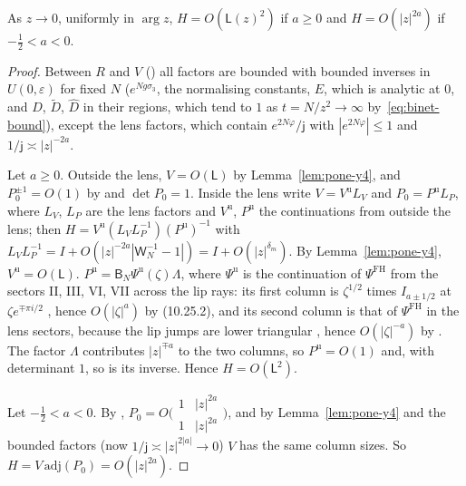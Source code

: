 \begin{lemma}[$H$ near $0$]\label{lem:pone-H0}
As $z\to0$, uniformly in $\arg z$, $H=O(\mathsf L(z)^2)$ if $a\ge0$ and $H=O(|z|^{2a})$ if $-\frac12<a<0$.
\end{lemma}

\begin{proof}
Between $R$ and $V$ (\cite[(4.1), (4.12), (5.1)]{WLXZ}) all factors are bounded with bounded inverses in $U(0,\varepsilon)$
for fixed $N$ ($e^{Ng\sigma_3}$, the normalising constants, $E$, which is analytic at $0$, and $D$, $\tilde D$, $\hat D$ in their
regions, which tend to $1$ as $t=N/z^2\to\infty$ by~\eqref{eq:binet-bound}), except the lens factors, which contain
$e^{2N\varphi}/\mathsf j$ with $|e^{2N\varphi}|\le1$ and $1/\mathsf j\asymp|z|^{-2a}$.

Let $a\ge0$. Outside the lens, $V=O(\mathsf L)$ by Lemma~\ref{lem:pone-y4}, and $P_0^{\pm1}=O(1)$ by \cite[(5.5)]{KV} and
$\det P_0=1$. Inside the lens write $V=V^{\mathrm u}L_V$ and $P_0=P^{\mathrm u}L_P$, where $L_V$, $L_P$ are the lens factors
and $V^{\mathrm u}$, $P^{\mathrm u}$ the continuations from outside the lens; then $H=V^{\mathrm u}(L_VL_P^{-1})(P^{\mathrm u})^{-1}$
with $L_VL_P^{-1}=I+O(|z|^{-2a}|\mathsf W_N^{-1}-1|)=I+O(|z|^{\delta_m})$. By Lemma~\ref{lem:pone-y4}, $V^{\mathrm u}=O(\mathsf L)$.
$P^{\mathrm u}=\mathsf B_N\Psi^{\mathrm u}(\zeta)\Lambda$, where $\Psi^{\mathrm u}$ is the continuation of $\Psi^{\mathrm{FH}}$ from the
sectors II, III, VI, VII across the lip rays: its first column is $\zeta^{1/2}$ times $I_{a\pm1/2}$ at $\zeta e^{\mp\pi i/2}$
\cite[(4.27)--(4.28), (4.31)--(4.32), (4.34)]{Van}, hence $O(|\zeta|^a)$ by (10.25.2), and its second column is that of
$\Psi^{\mathrm{FH}}$ in the lens sectors, because the lip jumps are lower triangular \cite[(5.18), (5.20)]{KV}, hence
$O(|\zeta|^{-a})$ by \cite[(5.22)]{KV}. The factor $\Lambda$ contributes $|z|^{\mp a}$ to the two columns, so
$P^{\mathrm u}=O(1)$ and, with determinant $1$, so is its inverse. Hence $H=O(\mathsf L^2)$.

Let $-\frac12<a<0$. By \cite[(5.4)]{KV}, $P_0=O\bigl(\begin{smallmatrix}1&|z|^{2a}\\1&|z|^{2a}\end{smallmatrix}\bigr)$, and by
Lemma~\ref{lem:pone-y4} and the bounded factors (now $1/\mathsf j\asymp|z|^{2|a|}\to0$) $V$ has the same column sizes. So
$H=V\,\mathrm{adj}(P_0)=O(|z|^{2a})$.
\end{proof}

